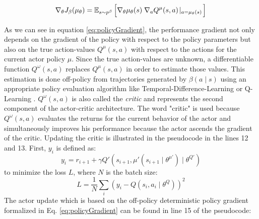 \begin{equation}\label{eq:policyGradient}
    \nabla_\theta J_\beta (\mu_\theta) = 
    \operatorname{\mathbb{E}}_{s \sim p^\beta}
    \Big[ \nabla_\theta \mu_\theta(s) \; \nabla_a Q^\mu (s,a) \!\mid_{a = \mu_\theta (s)} \! \Big]
\end{equation}


As we can see in equation \ref{eq:policyGradient}, the performance gradient not only depends on the gradient of the policy with respect to the policy parameters but also on the true action-values $Q^\mu(s,a)$ with respect to the actions for the current actor policy $\mu$. Since the true action-values are unknown, a differentiable function $Q^ \omega(s,a)$ replaces $Q^\mu(s,a)$ in order to estimate those values. This estimation is done off-policy from trajectories generated by $\beta(a\!\mid\!s)$ using an appropriate policy evaluation algorithm like Temporal-Difference-Learning or Q-Learning \cite[p.~5]{silver2014deterministic}. $Q^ \omega(s,a)$ is also called the \textit{critic} and represents the second component of the actor-critic architecture. The word "critic" is used because $Q^ \omega(s,a)$ evaluates the returns for the current behavior of the actor and simultaneously improves his performance because the actor ascends the gradient of the critic. Updating the critic is illustrated in the pseudocode in the lines 12 and 13. First, $y_i$ is defined as:
\begin{equation*}
    y_i = r_{i+1} + \gamma Q' (s_{i+1}, \mu'(s_{i+1} \mid \theta^{\mu'})  \mid \theta^{Q'})
\end{equation*}
to minimize the loss $L$, where $N$ is the batch size:
\begin{equation*}
    L = \frac{1}{N} \sum_i{(y_i - Q(s_i, a_i \mid \theta^Q))^2}
\end{equation*}
The actor update which is based on the off-policy deterministic policy gradient formalized in Eq. \ref{eq:policyGradient} can be found in line 15 of the pseudocode:

